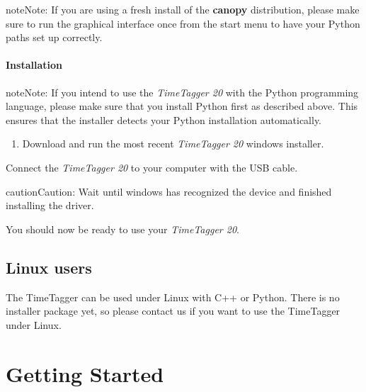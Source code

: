 \documentclass[letterpaper,10pt,english]{sphinxmanual}
\begin{document}
\begin{notice}{note}{Note:}
If you are using a fresh install of the \textbf{canopy} distribution, please make sure to run the graphical interface once from the start menu to have your Python paths set up correctly.
\end{notice}


\subsubsection{Installation}
\label{sections/installation:installation}
\begin{notice}{note}{Note:}
If you intend to use the \emph{TimeTagger 20} with the Python programming language, please make sure that you install Python first as described above. This ensures that the installer detects your Python installation automatically.
\end{notice}
\begin{enumerate}
\item {} 
Download and run the most recent \emph{TimeTagger 20} windows installer.

\end{enumerate}

Connect the \emph{TimeTagger 20} to your computer with the USB cable.

\begin{notice}{caution}{Caution:}
Wait until windows has recognized the device and finished installing the driver.
\end{notice}

You should now be ready to use your \emph{TimeTagger 20}.


\section{Linux users}
\label{sections/installation:linux-users}
The TimeTagger can be used under Linux with C++ or Python. There is no installer package yet, so please contact us if you want to use the TimeTagger under Linux.


\chapter{Getting Started}
\label{sections/gettingStarted:getting-started}\label{sections/gettingStarted:quickstart}\label{sections/gettingStarted::doc}
\end{document}
